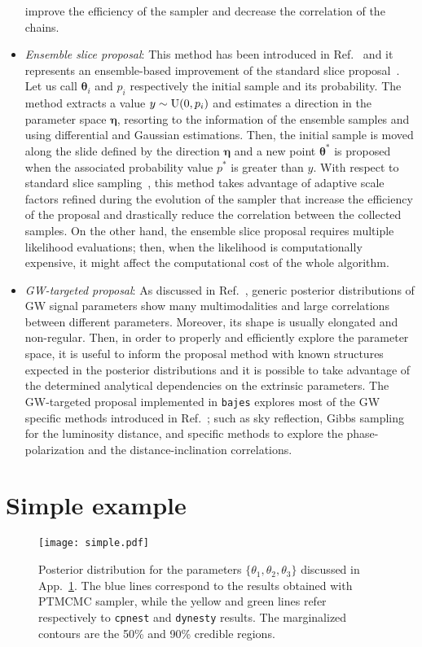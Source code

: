 \documentclass[prd,aps,twocolumn,a4paper,showkeys,nofootinbib,floatfix]{revtex4-1}
\def\params{\boldsymbol{\theta}}
\newcommand{\bajes}{{\tt bajes}}
\begin{document}
\begin{itemize}
improve the efficiency of the sampler and decrease the correlation
of the chains.
\item {\it Ensemble slice proposal}: This method has been introduced in
Ref.~\cite{Karamanis:2020zss}
and it represents an ensemble-based 
improvement of the standard slice 
proposal~\cite{neal2003}.
Let us call $\params_i$ and $p_i$ respectively the initial sample and its probability.
The method extracts a value $y\sim{\rm U}(0,p_i)$ and
estimates a direction in the parameter space $\boldsymbol{\eta}$,
resorting to the information
of the ensemble samples and
using differential and Gaussian estimations.
Then, the initial sample is moved along the slide defined by the direction $\boldsymbol{\eta}$
and a new point $\params^*$ is proposed when the associated probability value $p^*$ is
greater than $y$.
With respect to standard slice sampling~\cite{neal2003},
this method takes advantage of adaptive scale factors refined 
during the evolution of the sampler that increase the efficiency of 
the proposal and drastically reduce the correlation between the 
collected samples.
On the other hand, the ensemble slice proposal requires multiple
likelihood evaluations; then,
when the likelihood is computationally expensive,
it might affect the computational cost 
of the whole algorithm.
\item {\it GW-targeted proposal}: 
As discussed in Ref.~\cite{Veitch:2009hd,Veitch:2014wba},
generic posterior distributions of GW signal parameters 
show many multimodalities and 
large correlations between different parameters.
Moreover, its shape is usually elongated and non-regular.
Then, in order to properly and efficiently explore the parameter 
space, it is useful to inform the proposal method with 
known structures expected in the posterior distributions
and it is possible to take advantage of the
determined analytical dependencies on the extrinsic parameters.
The GW-targeted proposal implemented in {\bajes}
explores most of the GW specific methods introduced
in Ref.~\cite{Veitch:2009hd,Veitch:2014wba};
such as sky reflection,
Gibbs sampling for the luminosity distance,
and specific methods to explore the 
phase-polarization and the					
distance-inclination correlations.								
\end{itemize}

\section{Simple example}
\label{app:example}

\begin{figure}[t]
	\centering 
	\texttt{[image: simple.pdf]}
	\caption{Posterior distribution for the parameters $\{\theta_1,\theta_2,\theta_3\}$
		discussed in App.~\ref{app:example}. The blue lines correspond to the 
		results obtained with PTMCMC sampler, while the yellow and green lines refer 
		respectively to {\tt cpnest} and {\tt dynesty} results. 
		The marginalized contours are the 50\% and 90\%
		credible regions.}
	\label{fig:exe}
\end{figure}
\end{document}

